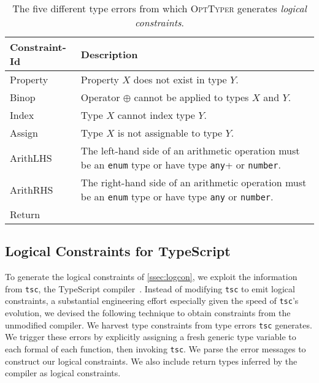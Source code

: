 \documentclass[acmsmall, review, anonymous]{acmart}\settopmatter{printfolios=true,printccs=false,printacmref=false}
\newcommand{\projectname}{\textsc{OptTyper}\xspace}
\begin{document}
\begin{table*}[t]
	\centering
	\caption{The five different type errors from which \projectname generates \textit{logical constraints}.}
	\label{tab:constraints}
	\begin{tabularx}{\textwidth}{lX}
		\toprule
		Constraint-Id & Description                                                                                  \\
		\midrule
		Property      & Property $X$ does not exist in type $Y$.                                                     \\
		Binop         & Operator $\oplus$ cannot be applied
		to types $X$ and $Y$.                                                                                        \\
		Index         & Type $X$ cannot index type $Y$.                                                              \\
		Assign         & Type $X$ is not assignable to type $Y$.                                                              \\
		ArithLHS      & The left-hand side of an arithmetic operation must be
		an \texttt{enum} type or have type \texttt{any}+ or \texttt{number}.    \\
		ArithRHS      & The right-hand side of an arithmetic operation must be
		an \texttt{enum} type or have type \texttt{any} or \texttt{number}. \\
		Return      & \\
		\bottomrule
	\end{tabularx}
\end{table*}

\subsection{Logical Constraints for TypeScript}
\label{ssec:logprodts}

To generate the logical constraints of \cref{ssec:logcon}, we exploit the information from \lstinline+tsc+, the TypeScript compiler~\cite{typescript}.
%
Instead of modifying \lstinline+tsc+ to emit logical constraints, a substantial
engineering effort especially given the speed of \lstinline+tsc+'s evolution,
we devised the following technique to obtain constraints from the unmodified compiler.
%
We harvest type constraints from type errors \lstinline+tsc+ generates.  We trigger
these errors by explicitly assigning a fresh generic type variable to
each formal of each function, then invoking \lstinline+tsc+.
%
We parse the error messages to construct our logical constraints.
%
We also include return types inferred by the compiler as logical constraints.
%
\end{document}
